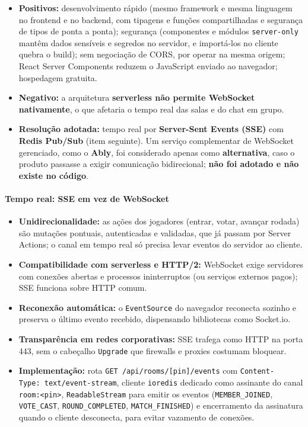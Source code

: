 \documentclass[
  brazilian,
  11pt,
]{article}
\providecommand{\tightlist}{%
  \setlength{\itemsep}{0pt}\setlength{\parskip}{0pt}}
\begin{document}
\begin{itemize}
\tightlist
\item
  \textbf{Positivos:} desenvolvimento rápido (mesmo framework e mesma linguagem no frontend e no backend, com tipagens e funções compartilhadas e segurança de tipos de ponta a ponta); segurança (componentes e módulos \texttt{server-only} mantêm dados sensíveis e segredos no servidor, e importá-los no cliente quebra o build); sem negociação de CORS, por operar na mesma origem; React Server Components reduzem o JavaScript enviado ao navegador; hospedagem gratuita.
\item
  \textbf{Negativo:} a arquitetura \textbf{serverless não permite WebSocket nativamente}, o que afetaria o tempo real das salas e do chat em grupo.
\item
  \textbf{Resolução adotada:} tempo real por \textbf{Server-Sent Events (SSE)} com \textbf{Redis Pub/Sub} (item seguinte). Um serviço complementar de WebSocket gerenciado, como o \textbf{Ably}, foi considerado apenas como \textbf{alternativa}, caso o produto passasse a exigir comunicação bidirecional; \textbf{não foi adotado e não existe no código}.
\end{itemize}

\paragraph{Tempo real: SSE em vez de WebSocket}\label{tempo-real-sse-em-vez-de-websocket}

\begin{itemize}
\tightlist
\item
  \textbf{Unidirecionalidade:} as ações dos jogadores (entrar, votar, avançar rodada) são mutações pontuais, autenticadas e validadas, que já passam por Server Actions; o canal em tempo real só precisa levar eventos do servidor ao cliente.
\item
  \textbf{Compatibilidade com serverless e HTTP/2:} WebSocket exige servidores com conexões abertas e processos ininterruptos (ou serviços externos pagos); SSE funciona sobre HTTP comum.
\item
  \textbf{Reconexão automática:} o \texttt{EventSource} do navegador reconecta sozinho e preserva o último evento recebido, dispensando bibliotecas como Socket.io.
\item
  \textbf{Transparência em redes corporativas:} SSE trafega como HTTP na porta 443, sem o cabeçalho \texttt{Upgrade} que firewalls e proxies costumam bloquear.
\item
  \textbf{Implementação:} rota \texttt{GET\ /api/rooms/{[}pin{]}/events} com \texttt{Content-Type:\ text/event-stream}, cliente \texttt{ioredis} dedicado como assinante do canal \texttt{room:\textless{}pin\textgreater{}}, \texttt{ReadableStream} para emitir os eventos (\texttt{MEMBER\_JOINED}, \texttt{VOTE\_CAST}, \texttt{ROUND\_COMPLETED}, \texttt{MATCH\_FINISHED}) e encerramento da assinatura quando o cliente desconecta, para evitar vazamento de conexões.
\end{itemize}
\end{document}
